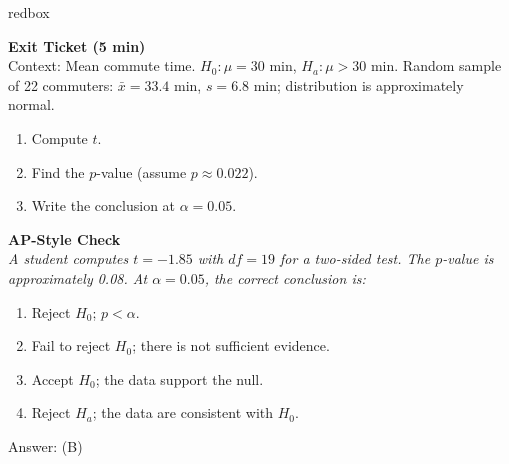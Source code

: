 \documentclass[10pt]{article}
\begin{document}
\begin{skillbox}{redbox}
\begin{minipage}[t]{0.48\linewidth}
    \textbf{Exit Ticket (5 min)}\\
    Context: Mean commute time. $H_0: \mu = 30$ min, $H_a: \mu > 30$ min.
    Random sample of 22 commuters: $\bar x = 33.4$ min, $s = 6.8$ min; distribution is
    approximately normal.
    \begin{enumerate}
        \item Compute $t$.
        \item Find the $p$-value (assume $p \approx 0.022$).
        \item Write the conclusion at $\alpha = 0.05$.
    \end{enumerate}
\end{minipage}
\hfill
\begin{minipage}[t]{0.48\linewidth}
    \textbf{AP-Style Check}\\
    \textit{A student computes $t = -1.85$ with $df = 19$ for a two-sided test. The
    $p$-value is approximately 0.08. At $\alpha = 0.05$, the correct conclusion is:}
    \begin{enumerate}[label=(\Alph*)]
        \item Reject $H_0$; $p < \alpha$.
        \item Fail to reject $H_0$; there is not sufficient evidence.
        \item Accept $H_0$; the data support the null.
        \item Reject $H_a$; the data are consistent with $H_0$.
    \end{enumerate}
    Answer: (B)
\end{minipage}
\end{skillbox}
\end{document}
